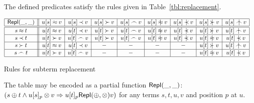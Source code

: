  \begin{lemma} \label{le:replacement-in-atoms}
The defined predicates satisfy the rules
given in Table~\ref {tbl:replacement}.
\begin{table}[hbt]
\[\begin{array}{|c||c|c|c|c|c|c|c|c|}
\hline
 \Repl\_\_   & u[s]\Eq v   & u[s]\Incl v & u[s]\Cont v & u[s]\Int v & u[s]\notEq v & u[s]\notIncl v & u[s]\notCont v & u[s]\notInt v\\
\hline
\hline
s\Eq t   & u[t]\Eq v   & u[t]\Incl v & u[t]\Cont v & u[t]\Int v & u[t]\notEq v & u[t]\notIncl v & u[t]\notCont v & u[t]\notInt v\\
\hline
s\Incl t & u[t]\Cont v & u[t]\Int v  & u[t]\Cont v & u[t]\Int v & u[t]\notEq v & u[t]\notIncl v & u[t]\notEq v   & u[t]\notIncl v \\
\hline
s\Cont t & u[t]\Eq v   & u[t]\Incl v & -           & -          & -            & -              & u[t]\notCont v & u[t]\notInt v \\
\hline
s\Int t  & u[t]\Cont v & u[t]\Int v  & -           & -          & -            & -              & u[t]\notEq v   & u[t]\notIncl v \\
\hline 
\end{array}\vspace{-1ex}\]
\caption{Rules for subterm replacement} \label{tbl:replacement}
\end{table}
\end{lemma}

The table may be encoded as a partial function \(\mbox {\sf Repl}(\_,\_)\): \((s\oplus
t\land u[s]_p\otimes v\mathrel\Rightarrow u[t]_p \mbox {\sf Repl}(\oplus,\otimes) v)\) for any terms
$s,t,u,v$ and position $p$ at $u$.

